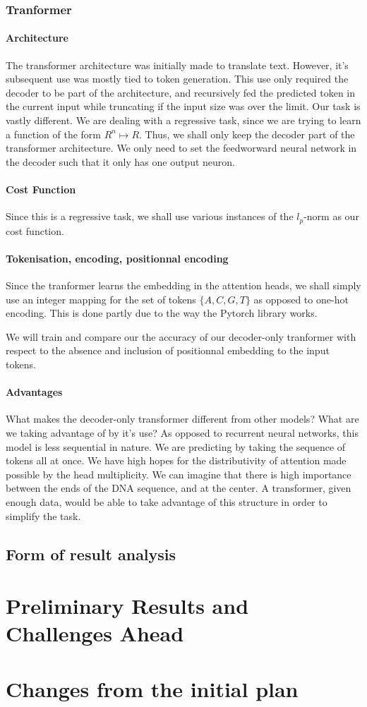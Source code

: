 \documentclass{article}
\begin{document}
\subsubsection{Tranformer}
\paragraph{Architecture}
The transformer architecture was initially made to translate text.
However, it's subsequent use was mostly tied to token generation. 
This use only required the decoder to be part of the architecture, 
and recursively fed the predicted token in the current input while 
truncating if the input size was over the limit.
Our task is vastly different. We are dealing with a regressive task,
since we are trying to learn a function of the form $R^n \mapsto R$.
Thus, we shall only keep the decoder part of the transformer architecture. 
We only need to set the feedworward neural network in the decoder such that 
it only has one output neuron.
\paragraph{Cost Function}
Since this is a regressive task, we shall use various instances of the 
$l_p$-norm as our cost function.

\paragraph{Tokenisation, encoding, positionnal encoding}
Since the tranformer learns the embedding in the attention heads, \cite{transformers} we
shall simply use an integer mapping for the set of tokens $\{A,C,G,T\}$ as opposed to 
one-hot encoding. This is done partly due to the way the Pytorch library works.

We will train and compare our the accuracy of our decoder-only tranformer with 
respect to the absence and inclusion of positionnal embedding to the input tokens.


\paragraph{Advantages}
What makes the decoder-only transformer different from other models? What are
we taking advantage of by it's use? As opposed to recurrent neural networks, 
this model is less sequential in nature. We are predicting by 
taking the sequence of tokens all at once. We have high hopes for the 
distributivity of attention made possible by the head multiplicity.
We can imagine that there is high importance between the ends of the DNA 
sequence, and at the center. A transformer, given enough data, would 
be able to take advantage of this structure in order to simplify the task.


\subsection{Form of result analysis}

\section{Preliminary Results and Challenges Ahead}

\section{Changes from the initial plan}



\end{document}

